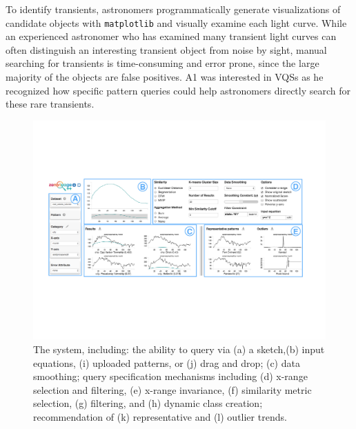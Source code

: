 \par To identify transients, astronomers programmatically generate visualizations of candidate objects with \texttt{matplotlib} and visually examine each light curve. While an experienced astronomer who has examined many transient light curves can often distinguish an interesting transient object from noise by sight, manual searching for transients is time-consuming and error prone, since the large majority of the objects are false positives. A1 was interested in VQSs as he recognized how specific pattern queries could help astronomers directly search for these rare transients.
\begin{figure}[ht!]
  \centering
  \vspace{-5pt}
  \includegraphics[width=0.95\linewidth]{figures/zvpp_system.pdf} %
  \vspace{-5pt}\caption{The \zvpp system, including: the ability to query via (a) a sketch,(b) input equations, (i) uploaded patterns, or (j) drag and drop; (c) data smoothing; query specification mechanisms including (d) x-range selection and filtering, (e) x-range invariance, (f) similarity metric selection, (g) filtering, and (h) dynamic class creation; recommendation of (k) representative and (l) outlier trends.} %
  \label{zvOverview}
  \vspace{-5pt}
\end{figure}
